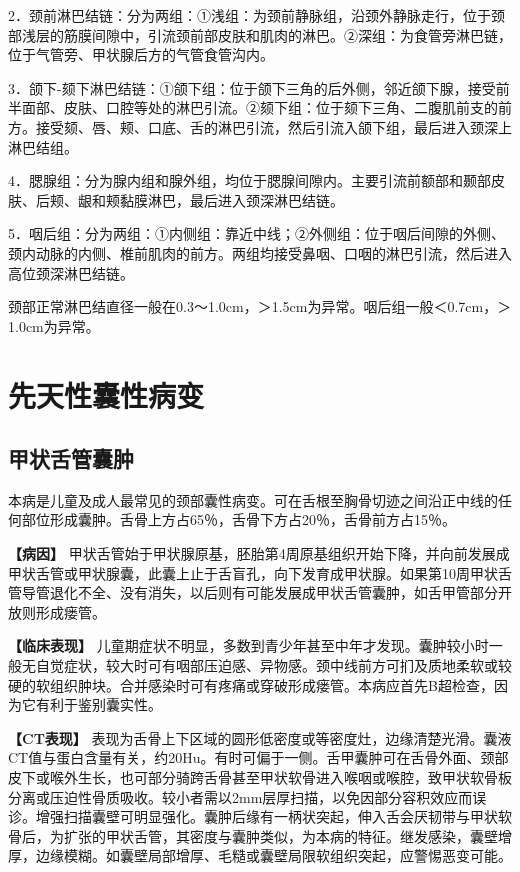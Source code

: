 2．颈前淋巴结链：分为两组：①浅组：为颈前静脉组，沿颈外静脉走行，位于颈部浅层的筋膜间隙中，引流颈前部皮肤和肌肉的淋巴。②深组：为食管旁淋巴链，位于气管旁、甲状腺后方的气管食管沟内。

3．颌下-颏下淋巴结链：①颌下组：位于颌下三角的后外侧，邻近颌下腺，接受前半面部、皮肤、口腔等处的淋巴引流。②颏下组：位于颏下三角、二腹肌前支的前方。接受颏、唇、颊、口底、舌的淋巴引流，然后引流入颌下组，最后进入颈深上淋巴结组。

4．腮腺组：分为腺内组和腺外组，均位于腮腺间隙内。主要引流前额部和颞部皮肤、后颊、龈和颊黏膜淋巴，最后进入颈深淋巴结链。

5．咽后组：分为两组：①内侧组：靠近中线；②外侧组：位于咽后间隙的外侧、颈内动脉的内侧、椎前肌肉的前方。两组均接受鼻咽、口咽的淋巴引流，然后进入高位颈深淋巴结链。

颈部正常淋巴结直径一般在0.3～1.0cm，＞1.5cm为异常。咽后组一般＜0.7cm，＞1.0cm为异常。

\section{先天性囊性病变}

\subsection{甲状舌管囊肿}

本病是儿童及成人最常见的颈部囊性病变。可在舌根至胸骨切迹之间沿正中线的任何部位形成囊肿。舌骨上方占65％，舌骨下方占20％，舌骨前方占15％。

\textbf{【病因】}
甲状舌管始于甲状腺原基，胚胎第4周原基组织开始下降，并向前发展成甲状舌管或甲状腺囊，此囊上止于舌盲孔，向下发育成甲状腺。如果第10周甲状舌管导管退化不全、没有消失，以后则有可能发展成甲状舌管囊肿，如舌甲管部分开放则形成瘘管。

\textbf{【临床表现】}
儿童期症状不明显，多数到青少年甚至中年才发现。囊肿较小时一般无自觉症状，较大时可有咽部压迫感、异物感。颈中线前方可扪及质地柔软或较硬的软组织肿块。合并感染时可有疼痛或穿破形成瘘管。本病应首先B超检查，因为它有利于鉴别囊实性。

\textbf{【CT表现】}
表现为舌骨上下区域的圆形低密度或等密度灶，边缘清楚光滑。囊液CT值与蛋白含量有关，约20Hu。有时可偏于一侧。舌甲囊肿可在舌骨外面、颈部皮下或喉外生长，也可部分骑跨舌骨甚至甲状软骨进入喉咽或喉腔，致甲状软骨板分离或压迫性骨质吸收。较小者需以2mm层厚扫描，以免因部分容积效应而误诊。增强扫描囊壁可明显强化。囊肿后缘有一柄状突起，伸入舌会厌韧带与甲状软骨后，为扩张的甲状舌管，其密度与囊肿类似，为本病的特征。继发感染，囊壁增厚，边缘模糊。如囊壁局部增厚、毛糙或囊壁局限软组织突起，应警惕恶变可能。

